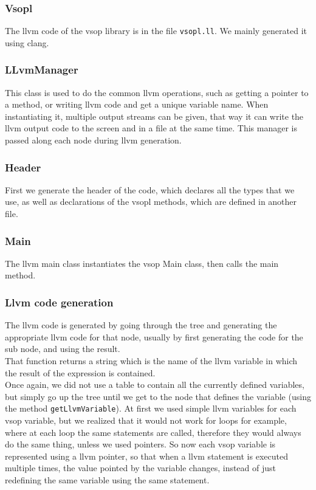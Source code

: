 \documentclass[a4paper,11pt]{article}
\begin{document}
  \subsubsection{Vsopl}
  The llvm code of the vsop library is in the file \texttt{vsopl.ll}. We mainly generated it using clang.

  \subsubsection{LLvmManager}
  This class is used to do the common llvm operations, such as getting a pointer to a method, or writing llvm code and get a unique variable name. When instantiating it, multiple output streams can be given, that way it can write the llvm output code to the screen and in a file at the same time. This manager is passed along each node during llvm generation.

    \subsubsection{Header}
    First we generate the header of the code, which declares all the types that we use, as well as declarations of the vsopl methods, which are defined in another file.

	\subsubsection{Main}
	The llvm main class instantiates the vsop Main class, then calls the main method.

	\subsubsection{Llvm code generation}
	The llvm code is generated by going through the tree and generating the appropriate llvm code for that node, usually by first generating the code for the sub node, and using the result.\\
	That function returns a string which is the name of the llvm variable in which the result of the expression is contained.\\
	Once again, we did not use a table to contain all the currently defined variables, but simply go up the tree until we get to the node that defines the variable (using the method \texttt{getLlvmVariable}). At first we used simple llvm variables for each vsop variable, but we realized that it would not work for loops for example, where at each loop the same statements are called, therefore they would always do the same thing, unless we used pointers. So now each vsop variable is represented using a llvm pointer, so that when a llvm statement is executed multiple times, the value pointed by the variable changes, instead of just redefining the same variable using the same statement.
\end{document}
